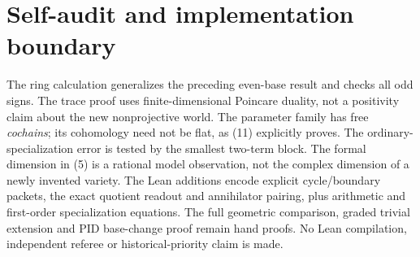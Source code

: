 \documentclass[11pt]{article}
\begin{document}
\section{Self-audit and implementation boundary}
The ring calculation generalizes the preceding even-base result and checks
all odd signs. The trace proof uses finite-dimensional Poincare duality,
not a positivity claim about the new nonprojective world. The parameter
family has free \emph{cochains}; its cohomology need not be flat, as (11)
explicitly proves. The ordinary-specialization error is tested by the
smallest two-term block. The formal dimension in (5) is a rational model
observation, not the complex dimension of a newly invented variety.
The Lean additions encode explicit cycle/boundary packets, the exact
quotient readout and annihilator pairing, plus arithmetic and first-order
specialization equations. The full geometric comparison, graded trivial
extension and PID base-change proof remain hand proofs. No Lean compilation,
independent referee or historical-priority claim is made.
\end{document}
